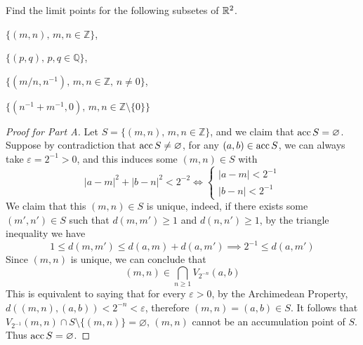 \documentclass[../../main.tex]{subfiles}
\begin{document}
\begin{wts}
   Find the limit points for the following subsetes of $\mathbb{R}^2$.
   \begin{enumalpha}
        \item $\{(m,n),\,m,n\in\mathbb{Z}\}$,
        \item $\{(p,q),\,p,q\in\mathbb{Q}\}$,
        \item $\{(m/n,n^{-1}),\,m,n\in\mathbb{Z},\,n\neq 0\}$,
        \item $\{(n^{-1}+m^{-1},0),\,m,n\in\mathbb{Z}\setminus\{0\}\}$
   \end{enumalpha}
\end{wts}
\begin{proof}[Proof for Part A]
    Let $S=\{(m,n),\,m,n\in\mathbb{Z}\}$, and we claim that $\operatorname{acc}{S}=\varnothing$. Suppose by contradiction that $\operatorname{acc}{S}\neq\varnothing$, for any $(a,b)\in\operatorname{acc}{S}$, we can always take $\varepsilon=2^{-1}>0$, and this induces some $(m,n)\in S$ with 
    \[
        |a-m|^2+|b-n|^2<2^{-2}\iff \begin{cases}|a-m|<2^{-1}\\
        |b-n|<2^{-1}\end{cases}
    \]
    We claim that this $(m,n)\in S$ is unique, indeed, if there exists some $(m',n')\in S$ such that $d(m,m')\geq 1$ and $d(n,n')\geq 1$, by the triangle inequality we have
    \[
    1\leq d(m,m')\leq d(a,m) + d(a,m')\implies 2^{-1}\leq d(a,m')
    \]
    Since $(m,n)$ is unique, we can conclude that 
    \[
        (m,n)\in \bigcap_{n\geq 1} V_{2^{-n}}(a,b)
    \]
    This is equivalent to saying that for every $\varepsilon>0$, by the Archimedean Property, $d((m,n),(a,b))<2^{-n}<\varepsilon$, therefore $(m,n)=(a,b)\in S$. It follows that $V_{2^{-1}}(m,n)\cap S\setminus\{(m,n)\}=\varnothing$, $(m,n)$ cannot be an accumulation point of $S$. Thus $\operatorname{acc}{S}=\varnothing$.
\end{proof}
\end{document}
